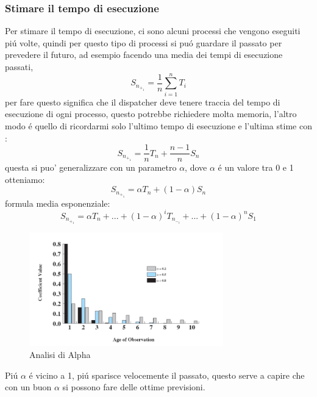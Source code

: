 \documentclass[11pt]{article}
\begin{document}
    \subsubsection*{Stimare il tempo di esecuzione}
    Per stimare il tempo di esecuzione, ci sono alcuni processi che vengono eseguiti piú volte,
    quindi per questo tipo di processi si puó guardare il passato per prevedere il futuro, ad esempio facendo una
    media dei tempi di esecuzione passati,
    \begin{equation}
    S_n_+_1 = \frac{1}{n} \sum_{i=1}^{n} T_i\label{eq:Media dei tempi di esecuzione}
    \end{equation}
    per fare questo significa che il dispatcher deve tenere traccia del tempo di esecuzione di ogni processo, questo
    potrebbe richiedere molta memoria, l'altro modo é quello di ricordarmi solo l'ultimo tempo di esecuzione e l'ultima
    stime con :
    \begin{equation}
        S_n_+_1 = \frac{1}{n}T_n + \frac{n-1}{n}S_n\label{eq:Mi ricordo solo l'ultimo tempo di esecuzione e l'ultima stima}
    \end{equation}
    questa si puo' generalizzare con un parametro $\alpha$, dove $\alpha$ é un valore tra 0 e 1 otteniamo:
    \begin{equation}
        S_n_+_1 = \alpha T_n + (1-\alpha)S_n\label{eq:formula con $\alpha$}
    \end{equation}
    formula media esponenziale:
    \begin{equation}
        S_n_+_1 = \alpha T_n + ... + (1-\alpha)^iT_n_-_i +...+ (1-\alpha)^nS_1\label{eq: Exponential Averaging }
    \end{equation}
    \begin{figure}
        \centering
        \includegraphics[width=0.75\textwidth]{immagini/AnalisiDiAlphaSpn}
        \caption{Analisi di Alpha}
    \end{figure}
    Piú $\alpha$ é vicino a 1, piú sparisce velocemente il passato, questo serve a capire che con un buon $\alpha$ si 
    possono fare delle ottime previsioni.
\end{document}
